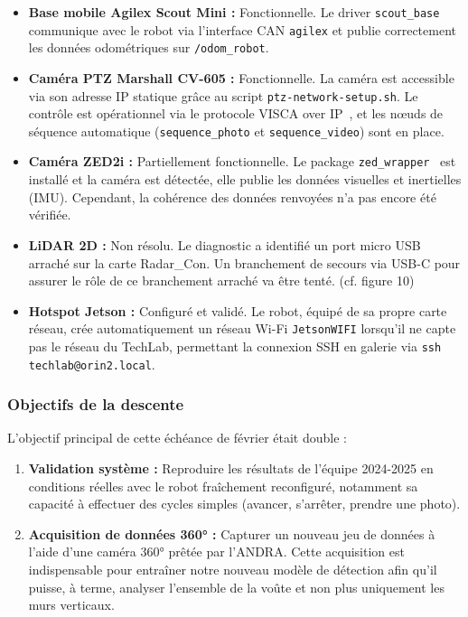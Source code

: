 \documentclass[12pt,a4paper]{article}
\begin{document}
\begin{itemize}
    \item \textbf{Base mobile Agilex Scout Mini :} Fonctionnelle. Le driver \texttt{scout\_base}~\cite{scout_ros2} communique avec le robot via l'interface CAN \texttt{agilex} et publie correctement les données odométriques sur \texttt{/odom\_robot}.
    \item \textbf{Caméra PTZ Marshall CV-605 :} Fonctionnelle. La caméra est accessible via son adresse IP statique grâce au script \texttt{ptz-network-setup.sh}. Le contrôle est opérationnel via le protocole VISCA over IP~\cite{marshall_cv605}, et les nœuds de séquence automatique (\texttt{sequence\_photo} et \texttt{sequence\_video}) sont en place.
    \item \textbf{Caméra ZED2i :} Partiellement fonctionnelle. Le package \texttt{zed\_wrapper}~\cite{zed_ros2_wrapper} est installé et la caméra est détectée, elle publie les données visuelles et inertielles (IMU). Cependant, la cohérence des données renvoyées n'a pas encore été vérifiée.
    \item \textbf{LiDAR 2D :} Non résolu. Le diagnostic a identifié un port micro USB arraché sur la carte Radar\_Con. Un branchement de secours via USB-C pour assurer le rôle de ce branchement arraché va être tenté. (cf. figure 10)
    \item \textbf{Hotspot Jetson :} Configuré et validé. Le robot, équipé de sa propre carte réseau, crée automatiquement un réseau Wi-Fi \texttt{JetsonWIFI} lorsqu'il ne capte pas le réseau du TechLab, permettant la connexion SSH en galerie via \texttt{ssh techlab@orin2.local}.
\end{itemize}

\subsubsection{Objectifs de la descente}

L'objectif principal de cette échéance de février était double :
\begin{enumerate}
    \item \textbf{Validation système :} Reproduire les résultats de l'équipe 2024-2025 en conditions réelles avec le robot fraîchement reconfiguré, notamment sa capacité à effectuer des cycles simples (avancer, s'arrêter, prendre une photo).
    \item \textbf{Acquisition de données 360° :} Capturer un nouveau jeu de données à l'aide d'une caméra 360° prêtée par l'ANDRA. Cette acquisition est indispensable pour entraîner notre nouveau modèle de détection afin qu'il puisse, à terme, analyser l'ensemble de la voûte et non plus uniquement les murs verticaux.
\end{enumerate}
\end{document}
